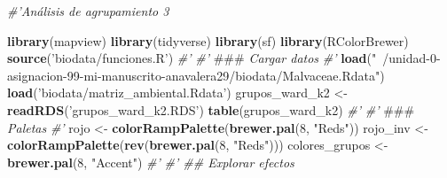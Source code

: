 \documentclass[11pt,]{article}
\newenvironment{Shaded}{\begin{snugshade}}{\end{snugshade}}
\newcommand{\KeywordTok}[1]{\textcolor[rgb]{0.13,0.29,0.53}{\textbf{#1}}}
\newcommand{\DecValTok}[1]{\textcolor[rgb]{0.00,0.00,0.81}{#1}}
\newcommand{\StringTok}[1]{\textcolor[rgb]{0.31,0.60,0.02}{#1}}
\newcommand{\CommentTok}[1]{\textcolor[rgb]{0.56,0.35,0.01}{\textit{#1}}}
\newcommand{\AlertTok}[1]{\textcolor[rgb]{0.94,0.16,0.16}{#1}}
\newcommand{\NormalTok}[1]{#1}
\begin{document}
\begin{Shaded}
\begin{Highlighting}[]
\CommentTok{#'Análisis de agrupamiento 3}

\KeywordTok{library}\NormalTok{(mapview)}
\KeywordTok{library}\NormalTok{(tidyverse)}
\KeywordTok{library}\NormalTok{(sf)}
\KeywordTok{library}\NormalTok{(RColorBrewer)}
\KeywordTok{source}\NormalTok{(}\StringTok{'biodata/funciones.R'}\NormalTok{)}
\CommentTok{#' }
\CommentTok{#' }\AlertTok{###}\CommentTok{ Cargar datos}
\CommentTok{#' }
\KeywordTok{load}\NormalTok{(}\StringTok{"~/unidad-0-asignacion-99-mi-manuscrito-anavalera29/biodata/Malvaceae.Rdata"}\NormalTok{)}
\KeywordTok{load}\NormalTok{(}\StringTok{'biodata/matriz_ambiental.Rdata'}\NormalTok{)}
\NormalTok{grupos_ward_k2 <-}\StringTok{ }\KeywordTok{readRDS}\NormalTok{(}\StringTok{'grupos_ward_k2.RDS'}\NormalTok{)}
\KeywordTok{table}\NormalTok{(grupos_ward_k2)}
\CommentTok{#' }
\CommentTok{#' }\AlertTok{###}\CommentTok{ Paletas}
\CommentTok{#' }
\NormalTok{rojo <-}\StringTok{ }\KeywordTok{colorRampPalette}\NormalTok{(}\KeywordTok{brewer.pal}\NormalTok{(}\DecValTok{8}\NormalTok{, }\StringTok{"Reds"}\NormalTok{))}
\NormalTok{rojo_inv <-}\StringTok{ }\KeywordTok{colorRampPalette}\NormalTok{(}\KeywordTok{rev}\NormalTok{(}\KeywordTok{brewer.pal}\NormalTok{(}\DecValTok{8}\NormalTok{, }\StringTok{"Reds"}\NormalTok{)))}
\NormalTok{colores_grupos <-}\StringTok{ }\KeywordTok{brewer.pal}\NormalTok{(}\DecValTok{8}\NormalTok{, }\StringTok{"Accent"}\NormalTok{)}
\CommentTok{#' }
\CommentTok{#' ## Explorar efectos}


\end{Highlighting}
\end{Shaded}
\end{document}
